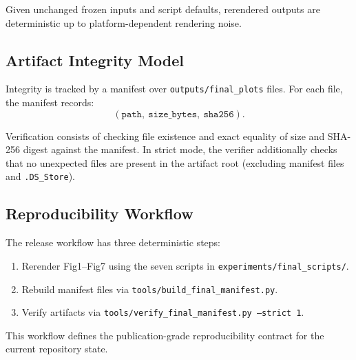 Given unchanged frozen inputs and script defaults, rerendered outputs are deterministic up to platform-dependent rendering noise.

\subsection{Artifact Integrity Model}
Integrity is tracked by a manifest over \texttt{outputs/final\_plots} files.
For each file, the manifest records:
\begin{equation}
(\texttt{path},\ \texttt{size\_bytes},\ \texttt{sha256}).
\end{equation}

Verification consists of checking file existence and exact equality of size and SHA-256 digest against the manifest.
In strict mode, the verifier additionally checks that no unexpected files are present in the artifact root (excluding manifest files and \texttt{.DS\_Store}).

\subsection{Reproducibility Workflow}
The release workflow has three deterministic steps:
\begin{enumerate}
\item Rerender Fig1--Fig7 using the seven scripts in \texttt{experiments/final\_scripts/}.
\item Rebuild manifest files via \texttt{tools/build\_final\_manifest.py}.
\item Verify artifacts via \texttt{tools/verify\_final\_manifest.py --strict 1}.
\end{enumerate}

This workflow defines the publication-grade reproducibility contract for the current repository state.

